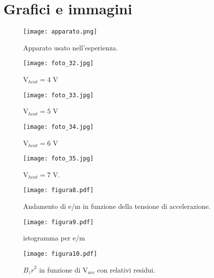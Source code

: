 \section{Grafici e immagini}

\begin{figure}[h]
	\centering
	\texttt{[image: apparato.png]}
	\caption{Apparato usato nell'esperienza.}
	\label{f:apparato}
\end{figure}
\begin{figure}[h]
	\centering
	\texttt{[image: foto\_32.jpg]}
	\caption{V$_{heat} = 4$ V}
	\label{f:figura_3}
\end{figure}
\begin{figure}[h]
	\centering
	\texttt{[image: foto\_33.jpg]}
	\caption{V$_{heat} = 5$ V}
           \label{f:figura_4}
\end{figure}
\begin{figure}[h]
	\centering
	\texttt{[image: foto\_34.jpg]}
	\caption{V$_{heat} = 6$ V}
	\label{f:figura_5}
\end{figure}
\begin{figure}[h]
	\centering
	\texttt{[image: foto\_35.jpg]}
	\caption{V$_{heat} = 7$ V.}
           \label{f:figura_6}
\end{figure}

\begin{figure}[h]
	\centering
	\texttt{[image: figura8.pdf]}
	\caption{Andamento di e/m in funzione della tensione di accelerazione.}
	\label{f:figura_8}
\end{figure}
\begin{figure}[h]
	\centering
	\texttt{[image: figura9.pdf]}
	\caption{istogramma per e/m}
           \label{f:figura_9}
\end{figure}
\begin{figure}[h]
	\centering
	\texttt{[image: figura10.pdf]}
	\caption{${B_z r}^2$ in funzione di V$_{acc}$ con relativi residui.}
           \label{f:figura_10}
\end{figure}